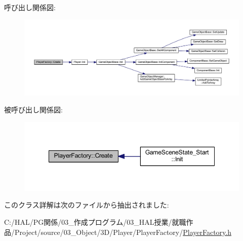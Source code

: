 呼び出し関係図\+:\nopagebreak
\begin{figure}[H]
\begin{center}
\leavevmode
\includegraphics[width=350pt]{class_player_factory_a7429328c81ec97fdaafb9eef756c0dba_cgraph}
\end{center}
\end{figure}
被呼び出し関係図\+:\nopagebreak
\begin{figure}[H]
\begin{center}
\leavevmode
\includegraphics[width=348pt]{class_player_factory_a7429328c81ec97fdaafb9eef756c0dba_icgraph}
\end{center}
\end{figure}


このクラス詳解は次のファイルから抽出されました\+:\begin{DoxyCompactItemize}
\item 
C\+:/\+H\+A\+L/\+P\+G関係/03\+\_\+作成プログラム/03\+\_\+\+H\+A\+L授業/就職作品/\+Project/source/03\+\_\+\+Object/3\+D/\+Player/\+Player\+Factory/\mbox{\hyperlink{_player_factory_8h}{Player\+Factory.\+h}}\end{DoxyCompactItemize}
